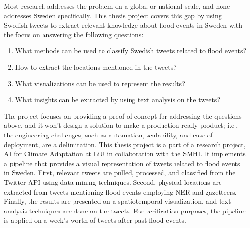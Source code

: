 Most research addresses the problem on a global or national scale, and none addresses Sweden
specifically. This thesis project covers this gap by using Swedish tweets to extract relevant
knowledge about flood events in Sweden with the focus on answering the following questions:
\begin{enumerate} \item What methods can be used to classify Swedish tweets related to flood events?
\item How to extract the locations mentioned in the tweets? \item What visualizations can be used to
represent the results? \item What insights can be extracted by using text analysis on the tweets?
\end{enumerate}

The project focuses on providing a proof of concept for addressing the questions above, and it won't
design a solution to make a production-ready product; i.e., the engineering challenges, such as
automation, scalability, and ease of deployment, are a delimitation. This thesis project is a part
of a research project, AI for Climate Adaptation \cite{nesetAI4ClimateAdaptation} at \ac{LiU} in
collaboration with the \ac{SMHI}. It implements a pipeline that provides a visual representation of
tweets related to flood events in Sweden. First, relevant tweets are pulled, processed, and
classified from the Twitter API using data mining techniques. Second, physical locations are
extracted from tweets mentioning flood events employing \ac{NER} and gazetteers. Finally, the
results are presented on a spatiotemporal visualization, and text analysis techniques are done on
the tweets. For verification purposes, the pipeline is applied on a week's worth of tweets after
past flood events.
